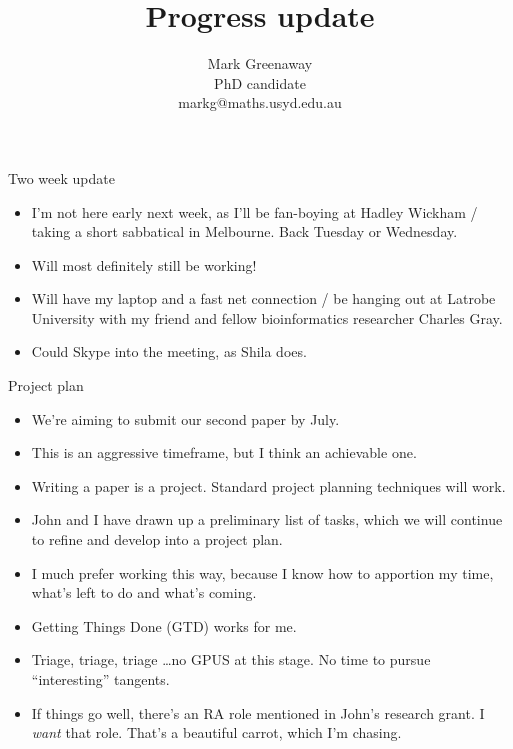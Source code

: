 \documentclass{beamer}
\title{Progress update}
\author{Mark Greenaway\\PhD candidate\\markg@maths.usyd.edu.au}
\begin{document}
\begin{frame}
\titlepage
\end{frame}

\begin{frame}{Two week update}
\begin{itemize}
\item I'm not here early next week, as I'll be fan-boying at Hadley Wickham / taking a short sabbatical in 
			Melbourne. Back Tuesday or Wednesday.
\item Will most definitely still be working!
\item Will have my laptop and a fast net connection / be hanging out at Latrobe University with my friend and 
			fellow bioinformatics researcher Charles Gray.
\item Could Skype into the meeting, as Shila does.
\end{itemize}
\end{frame}

\begin{frame}{Project plan}
\begin{itemize}
\item We're aiming to submit our second paper by July. \\
\item This is an aggressive timeframe, but I think an achievable one. \\
\item Writing a paper is a project. Standard project planning techniques will work. \\
\item John and I have drawn up a preliminary list of tasks, which we will continue to refine and develop
			into a project plan. \\
\item I much prefer working this way, because I know how to apportion my time, what's left to do and 
			what's coming. \\ 
\item Getting Things Done (GTD) works for me. \\
\item Triage, triage, triage \ldots no GPUS at this stage. No time to pursue ``interesting'' tangents.\\
\item If things go well, there's an RA role mentioned in John's research grant. I \emph{want} that role.
			That's a beautiful carrot, which I'm chasing.
\end{itemize}
\end{frame}
\end{document}
